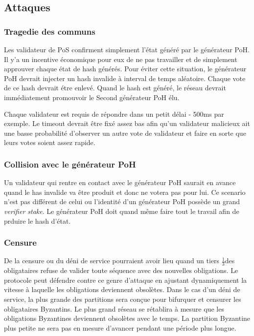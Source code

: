 \documentclass[12pt]{article}
\begin{document}
\subsection{Attaques}
\subsubsection{Tragedie des communs}
Les validateur de PoS confirment simplement l'état généré par le générateur PoH. Il y'a un incentive économique pour eux de ne pas travailler et de simplement approuver chaque état de hash générés. Pour éviter cette situation, le générateur PoH devrait injecter un hash invalide à interval de temps aléatoire. Chaque vote de ce hash devrait étre enlevé. Quand le hash est généré, le réseau devrait immédiatement promouvoir le Second générateur PoH élu.

Chaque validateur est requis de répondre dans un petit délai - 500ms par exemple. Le timeout devrait être fixé assez bas afin qu'un validateur malicieux ait une basse probabilité d'observer un autre vote de validateur et faire en sorte que leurs votes soient assez rapide.

\subsubsection{Collision avec le générateur PoH}\label{subsubsec:Collision}
Un validateur qui rentre en contact avec le générateur PoH saurait en avance quand le has invalide va être produit et donc ne votera pas pour lui. Ce scenario n'est pas différent de celui ou l'identité d'un générateur PoH possède un grand \textit{verifier stake}. Le générateur PoH doit quand même faire tout le travail afin de prduire le hash d'état.

\subsubsection{Censure}\label{Censure}
De la censure ou du déni de service pourraient avoir lieu quand un tiers \(\frac{1}{3}\)des obligataires refuse de valider toute séquence avec des nouvelles obligations. Le protocole peut défendre contre ce genre d’attaque en ajustant dynamiquement la vitesse à laquelle les obligations deviennent obsolètes. Dans le cas d’un déni de service, la plus grande des partitions sera conçue pour bifurquer et censurer les obligataires Byzantins. Le plus grand réseau se rétablira à mesure que les obligations Byzantines deviennent obsolètes avec le temps. La partition Byzantine plus petite ne sera pas en mesure d’avancer pendant une période plus longue.
\end{document}
